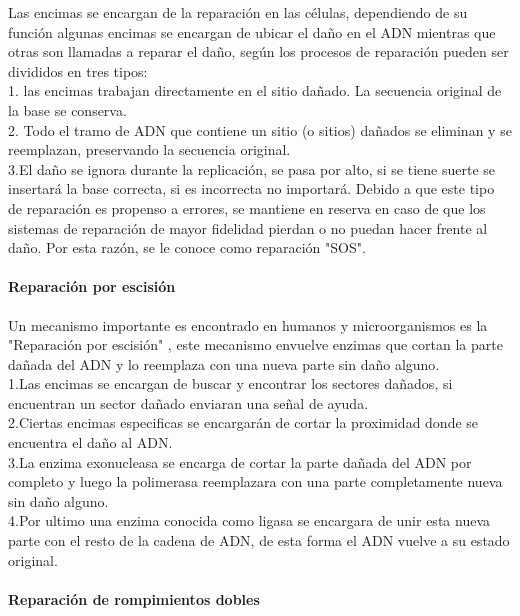 Las encimas se encargan de la reparación en las células, dependiendo de su función algunas encimas se encargan de ubicar el daño en el ADN mientras que otras son llamadas a reparar el daño, según \cite{Thormod} los procesos de reparación pueden ser divididos en tres tipos:\\

1. las encimas trabajan directamente en el sitio dañado. La secuencia original de la base se conserva.\\

2. Todo el tramo de ADN que contiene un sitio (o sitios) dañados se eliminan y se reemplazan, preservando la secuencia original.\\

3.El daño se ignora durante la replicación, se pasa por alto, si se tiene suerte se insertará la base correcta, si es incorrecta no importará. Debido a que este tipo de reparación es propenso a errores, se mantiene en reserva en caso de que los sistemas de reparación de mayor fidelidad pierdan o no puedan hacer frente al daño. Por esta razón, se le conoce como reparación "SOS".\\

\paragraph{Reparación por escisión}
Un mecanismo importante es encontrado en humanos y microorganismos es la "Reparación por escisión" , este mecanismo envuelve enzimas que cortan la parte dañada del ADN y lo reemplaza con una nueva parte sin daño alguno\cite{Thormod}.\\

1.Las encimas se encargan de buscar y encontrar los sectores dañados, si encuentran un sector dañado enviaran una señal de ayuda.\\

2.Ciertas encimas especificas se encargarán de cortar la proximidad donde se encuentra el daño al ADN.\\

3.La enzima exonucleasa se encarga de cortar la parte dañada del ADN por completo y luego la polimerasa reemplazara con una parte completamente nueva sin daño alguno.\\

4.Por ultimo una enzima conocida como ligasa se encargara de unir esta nueva parte con el resto de la cadena de ADN, de esta forma el ADN vuelve a su estado original.

\paragraph{Reparación de rompimientos dobles}

